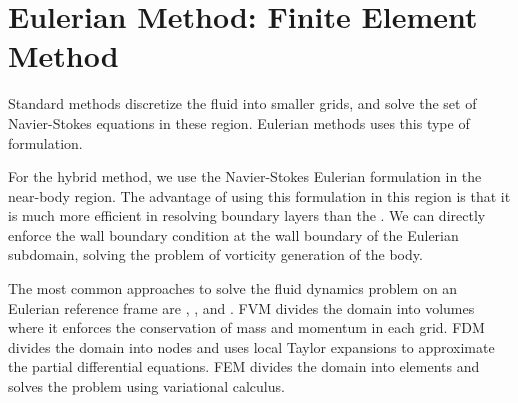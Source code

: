 \chapter{Eulerian Method: Finite Element Method}
\label{ch:eulerian}

%	

Standard  methods discretize the fluid into smaller grids, and solve the set of Navier-Stokes equations in these region. Eulerian methods uses this type of formulation.

For the hybrid method, we use the Navier-Stokes Eulerian formulation in the near-body region. The advantage of using this formulation in this region is that it is much more efficient in resolving boundary layers than the . We can directly enforce the wall boundary condition at the wall boundary of the Eulerian subdomain, solving the problem of vorticity generation of the body. %

The most common approaches to solve the fluid dynamics problem on an Eulerian reference frame are , , and . FVM divides the domain into volumes where it enforces the conservation of mass and momentum in each grid. FDM divides the domain into nodes and uses local Taylor expansions to approximate the partial differential equations. FEM divides the domain into elements and solves the problem using variational calculus. %

